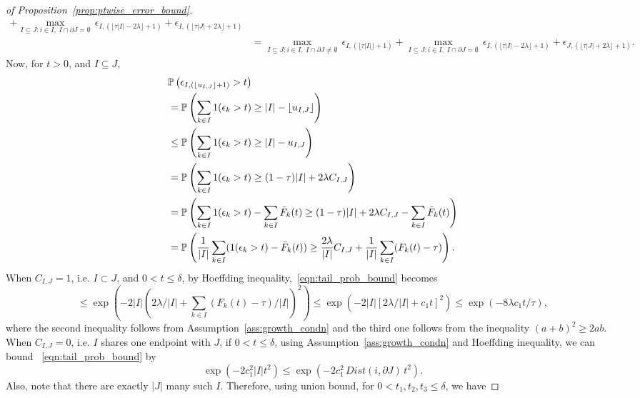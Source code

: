 \documentclass[11pt]{article}
\newcommand{\bP}{\mathbb{P}}
\theoremstyle{plain}
\theoremstyle{definition}
\theoremstyle{remark}
\begin{document}
\begin{appendix}
\begin{proof}[of Proposition~\ref{prop:ptwise_error_bound}]
\begin{align*}
    +\max_{I\subseteq J: i \in I,\;I\cap \partial J= \emptyset}\,\epsilon_{I,(\lfloor \tau |I|-2\lambda\rfloor+1)}
    +\epsilon_{I,(\lfloor \tau |J|+2\lambda\rfloor+1)}\\
    &= \max_{I\subseteq J: i \in I,\;I\cap \partial J\neq \emptyset}\,\epsilon_{I,(\lfloor \tau |I|\rfloor+1)} 
    +\max_{I\subseteq J: i \in I,\;I\cap \partial J= \emptyset}\,\epsilon_{I,(\lfloor \tau |I|-2\lambda\rfloor+1)}
    +\epsilon_{J,(\lfloor \tau |J|+2\lambda\rfloor+1)}.
\end{align*}
Now, for $t>0$, and $I\subseteq J$,
\begin{align}
    &\bP\left(\epsilon_{I,(\lfloor u_{I,J}\rfloor+1)}>t\right)\nonumber\\
    &=\bP\left(\sum_{k \in I} 1(\epsilon_k>t)\geq |I|-\lfloor u_{I,J}\rfloor\right)\nonumber\\
    &\leq \bP\left(\sum_{k \in I} 1(\epsilon_k>t)\geq |I|- u_{I,J}\right)\nonumber\\
    &=\bP\left(\sum_{k \in I} 1(\epsilon_k>t)\geq (1-\tau)|I|+2\lambda C_{I,J}\right)\nonumber\allowdisplaybreaks\\
    &=\bP\left(\sum_{k \in I} 1(\epsilon_k>t)-\sum_{k \in I} \Bar{F}_k(t)\geq (1-\tau)|I|+2\lambda C_{I,J}-\sum_{k \in I} \Bar{F}_k(t)\right)\nonumber\\
    &=\bP\left(\frac{1}{|I|}\sum_{k \in I} (1(\epsilon_k>t)-\Bar{F}_k(t))\geq \frac{2\lambda}{|I|} C_{I,J}+\frac{1}{|I|}\sum_{k \in I} (F_k(t)-\tau)\right)\label{eqn:tail_prob_bound}.
\end{align}
When $C_{I,J}=1$, i.e. $I \subset J$, and $0<t\leq \delta$, by Hoeffding inequality,~\eqref{eqn:tail_prob_bound} becomes 
\[\leq \exp{\left(-2|I|(2\lambda/|I|+\sum_{k \in I} (F_k(t)-\tau)/|I|)^2\right)}\leq\exp{\left(-2|I|[2\lambda/|I| +c_1t]^2\right)}\leq \exp{\left(-8\lambda c_1t/\tau\right)},\]
where the second inequality follows from Assumption~\ref{ass:growth_condn} and the third one follows from the inequality $(a+b)^2\geq 2ab$.\\
\noindent When $C_{I,J}=0$, i.e. $I$ shares one endpoint with $J$, if $0<t\leq \delta$, using Assumption~\ref{ass:growth_condn} and Hoeffding inequality, we can bound ~\eqref{eqn:tail_prob_bound} by
\begin{equation}\label{eqn:hpbd_boundary}
    \exp{\left(-2c_1^2|I|t^2\right)}\leq \exp{\left(-2c_1^2\,Dist(i,\partial J)\,t^2\right)}.
\end{equation}
Also, note that there are exactly $|J|$ many such $I$.
 Therefore, using union bound, for $0<t_1,t_2,t_3\leq \delta$, we have

\end{proof}
\end{appendix}
\end{document}
